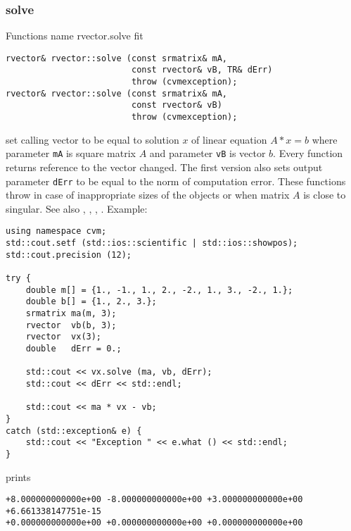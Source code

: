 \subsubsection{solve}
Functions%
\pdfdest name {rvector.solve} fit
\begin{verbatim}
rvector& rvector::solve (const srmatrix& mA,
                         const rvector& vB, TR& dErr)
                         throw (cvmexception);
rvector& rvector::solve (const srmatrix& mA,
                         const rvector& vB)
                         throw (cvmexception);
\end{verbatim}
set calling vector to be equal to solution $x$ of  linear equation
$A*x=b$ where parameter \verb"mA" is  square matrix $A$
and parameter \verb"vB" is  vector $b$.
Every function returns  reference to the vector changed.
The first version also sets output parameter \verb"dErr" to be equal
to the norm of computation error.
These functions throw 
in case of inappropriate sizes
of the objects or when  matrix $A$ is close to singular.
See also , 
, , .
Example:
\begin{Verbatim}
using namespace cvm;
std::cout.setf (std::ios::scientific | std::ios::showpos);
std::cout.precision (12);

try {
    double m[] = {1., -1., 1., 2., -2., 1., 3., -2., 1.};
    double b[] = {1., 2., 3.};
    srmatrix ma(m, 3);
    rvector  vb(b, 3);
    rvector  vx(3);
    double   dErr = 0.;

    std::cout << vx.solve (ma, vb, dErr);
    std::cout << dErr << std::endl;

    std::cout << ma * vx - vb;
}
catch (std::exception& e) {
    std::cout << "Exception " << e.what () << std::endl;
}
\end{Verbatim}
prints
\begin{Verbatim}
+8.000000000000e+00 -8.000000000000e+00 +3.000000000000e+00
+6.661338147751e-15
+0.000000000000e+00 +0.000000000000e+00 +0.000000000000e+00
\end{Verbatim}
\newpage


